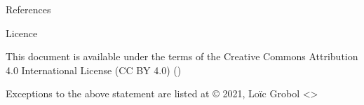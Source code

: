 \documentclass[xcolor={svgnames}, french]{beamer}
\begin{document}
\begin{frame}[allowframebreaks]{References}
	\printbibliography[heading=none]
\end{frame}

\begin{frame}{Licence}
	\begin{center}
		{\huge \ccby}
		\vfill
		This document is available under the terms of the Creative Commons Attribution 4.0 International License (CC BY 4.0) ()

		Exceptions to the above statement are listed at {\small{}}
		\vfill
		© 2021, Loïc Grobol <>

	\end{center}
\end{frame}
\end{document}
